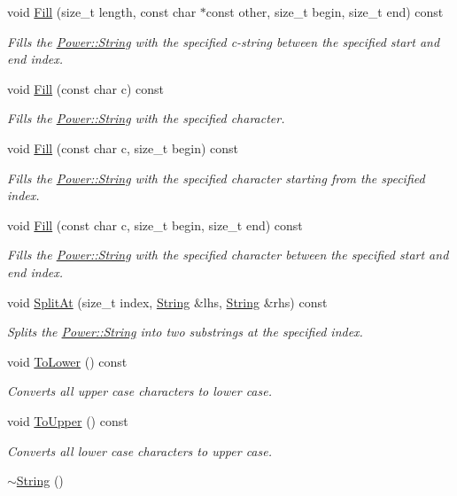 \begin{DoxyCompactItemize}
void \hyperlink{class_power_1_1_string_a6df9549c970e255b68be62942f4d83ca}{Fill} (size\+\_\+t length, const char $\ast$const other, size\+\_\+t begin, size\+\_\+t end) const
\begin{DoxyCompactList}\small\item\em Fills the \hyperlink{class_power_1_1_string}{Power\+::\+String} with the specified c-\/string between the specified start and end index. \end{DoxyCompactList}\item 
void \hyperlink{class_power_1_1_string_a8dbe442eba279eaa441b8e99bc80cb5c}{Fill} (const char c) const
\begin{DoxyCompactList}\small\item\em Fills the \hyperlink{class_power_1_1_string}{Power\+::\+String} with the specified character. \end{DoxyCompactList}\item 
void \hyperlink{class_power_1_1_string_a2dbda22c03de5742b8cf4fbd075e9dfd}{Fill} (const char c, size\+\_\+t begin) const
\begin{DoxyCompactList}\small\item\em Fills the \hyperlink{class_power_1_1_string}{Power\+::\+String} with the specified character starting from the specified index. \end{DoxyCompactList}\item 
void \hyperlink{class_power_1_1_string_ae1e7ac80b210811821a0a62eab36c2ac}{Fill} (const char c, size\+\_\+t begin, size\+\_\+t end) const
\begin{DoxyCompactList}\small\item\em Fills the \hyperlink{class_power_1_1_string}{Power\+::\+String} with the specified character between the specified start and end index. \end{DoxyCompactList}\item 
void \hyperlink{class_power_1_1_string_a7009c79c7fa9b393fdbbc1922b14403a}{Split\+At} (size\+\_\+t index, \hyperlink{class_power_1_1_string}{String} \&lhs, \hyperlink{class_power_1_1_string}{String} \&rhs) const
\begin{DoxyCompactList}\small\item\em Splits the \hyperlink{class_power_1_1_string}{Power\+::\+String} into two substrings at the specified index. \end{DoxyCompactList}\item 
void \hyperlink{class_power_1_1_string_ad1395f09eb54ec62ff077741203c27b5}{To\+Lower} () const
\begin{DoxyCompactList}\small\item\em Converts all upper case characters to lower case. \end{DoxyCompactList}\item 
void \hyperlink{class_power_1_1_string_a9b4fbde0111caf61d777aec6b5becf59}{To\+Upper} () const
\begin{DoxyCompactList}\small\item\em Converts all lower case characters to upper case. \end{DoxyCompactList}\item 
\hyperlink{class_power_1_1_string_af3e98839735047cdb9362232836fd773}{$\sim$\+String} ()
\end{DoxyCompactItemize}
